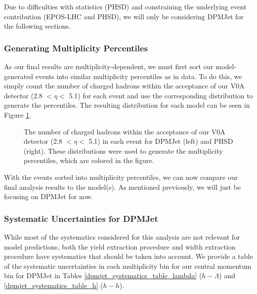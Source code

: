 Due to difficulties with statistics (PHSD) and constraining the underlying event contribution (EPOS-LHC and PHSD), we will only be considering DPMJet for the following sections.

\subsubsection{Generating Multiplicity Percentiles}
\label{model_mult_percentiles}
As our final results are multiplicity-dependent, we must first sort our model-generated events into similar multiplicity percentiles as in data. To do this, we simply count the number of charged hadrons within the acceptance of our V0A detector (2.8 $< \eta <$ 5.1) for each event and use the corresponding distribution to generate the percentiles. The resulting distribution for each model can be seen in Figure \ref{model_mult_percentiles_figure}.

\begin{figure}[ht]
\centering
\begin{subfigure}{
\texttt{[image: figures/dpmjet\_mult\_dist.png]}}
\end{subfigure}
\begin{subfigure}{
\texttt{[image: figures/phsd\_mult\_dist.png]}}
\end{subfigure}
\caption{The number of charged hadrons within the acceptance of our V0A detector (2.8 $< \eta <$ 5.1) in each event for DPMJet (left) and PHSD (right). These distributions were used to generate the multiplicity percentiles, which are colored in the figure.}
\label{model_mult_percentiles_figure}
\end{figure}

With the events sorted into multiplicity percentiles, we can now compare our final analysis results to the model(s). As mentioned previously, we will just be focusing on DPMJet for now.

\subsubsection{Systematic Uncertainties for DPMJet}
\label{dpmjet_systematics}
While most of the systematics considered for this analysis are not relevant for model predictions, both the yield extraction procedure and width extraction procedure have systematics that should be taken into account. We provide a table of the systematic uncertainties in each multiplicity bin for our central momentum bin for DPMJet in Tables \ref{dpmjet_systematics_table_lambda} ($h-\Lambda$) and \ref{dpmjet_systematics_table_h} ($h-h$).

